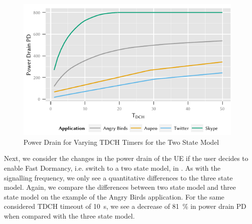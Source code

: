 \begin{figure}
	\centering
	\includegraphics{network/network_traces/numerical_results/figures/2_state_tdch_vs_power_drain}
	\caption{Power Drain for Varying \gls{TDCH} Timers for the Two State Model}\label{fig:network:network_traces:numerical_results:two_states:power_drain}
\end{figure}
Next, we consider the changes in the power drain of the \gls{UE} if the user decides to enable Fast Dormancy, i.e. switch to a two state model, in .
As with the signalling frequency, we only see a quantitative differences to the three state model.
Again, we compare the differences between two state model and three state model on the example of the Angry Birds application.
For the same considered \gls{TDCH} timeout of \SI{10}{\second}, we see a decrease of \SI{81}{\percent} in power drain \gls{PD} when compared with the three state model.

